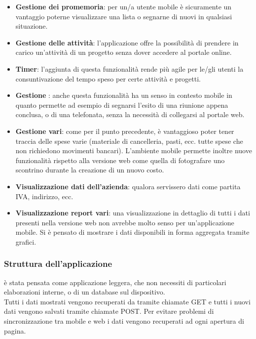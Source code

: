 \begin{itemize}
\item \textbf{Gestione dei promemoria}: per un/a utente mobile è sicuramente un vantaggio
poterne visualizzare una lista o segnarne di nuovi in qualsiasi situazione.
\item \textbf{Gestione delle attività}: l'applicazione offre la possibilità di prendere
in carico un'attività di un progetto senza dover accedere al portale online.
\item \textbf{Timer}: l'aggiunta di questa funzionalità rende più agile per le/gli utenti
la consuntivazione del tempo speso per certe attività e progetti.
\item \textbf{Gestione }: anche questa funzionalità ha un senso in contesto mobile
in quanto permette ad esempio di segnarsi l'esito di una riunione appena conclusa, o di una
telefonata, senza la necessità di collegarsi al portale web.
\item \textbf{Gestione  vari}: come per il punto precedente, è vantaggioso poter tener
traccia delle spese varie (materiale di cancelleria, pasti, ecc. tutte spese che non
richiedono movimenti bancari). L'ambiente mobile permette inoltre nuove funzionalità rispetto
alla versione web come quella di fotografare uno scontrino durante la creazione di un nuovo
costo.
\item \textbf{Visualizzazione dati dell'azienda}: qualora servissero dati come partita IVA,
indirizzo, ecc.
\item \textbf{Visualizzazione report vari}: una visualizzazione in dettaglio di tutti i dati
presenti nella versione web non avrebbe molto senso per un'applicazione mobile. Si è pensato
di mostrare i dati disponibili in forma aggregata tramite grafici.
\end{itemize}

\subsubsection{Struttura dell'applicazione}
\fiscoloMobile{} è stata pensata come applicazione leggera, che non necessiti di particolari
elaborazioni interne, o di un database sul dispositivo. \\
Tutti i dati mostrati vengono recuperati da \fiscoloWeb{} tramite chiamate GET e tutti i
nuovi dati vengono salvati tramite chiamate POST. Per evitare problemi di sincronizzazione
tra mobile e web i dati vengono recuperati ad ogni apertura di pagina. \\

